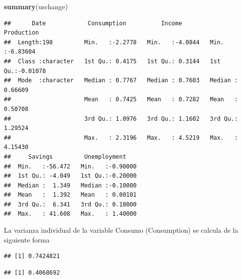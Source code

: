\documentclass[
]{article}
\newenvironment{Shaded}{\begin{snugshade}}{\end{snugshade}}
\newcommand{\FunctionTok}[1]{\textcolor[rgb]{0.13,0.29,0.53}{\textbf{#1}}}
\newcommand{\NormalTok}[1]{#1}
\newcommand{\SpecialCharTok}[1]{\textcolor[rgb]{0.81,0.36,0.00}{\textbf{#1}}}
\begin{document}
\begin{Shaded}
\begin{Highlighting}[]
\FunctionTok{summary}\NormalTok{(uschange)}
\end{Highlighting}
\end{Shaded}

\begin{verbatim}
##      Date            Consumption          Income          Production      
##  Length:198         Min.   :-2.2778   Min.   :-4.0844   Min.   :-6.83604  
##  Class :character   1st Qu.: 0.4175   1st Qu.: 0.3144   1st Qu.:-0.01078  
##  Mode  :character   Median : 0.7767   Median : 0.7603   Median : 0.66609  
##                     Mean   : 0.7425   Mean   : 0.7282   Mean   : 0.50708  
##                     3rd Qu.: 1.0976   3rd Qu.: 1.1602   3rd Qu.: 1.29524  
##                     Max.   : 2.3196   Max.   : 4.5219   Max.   : 4.15430  
##     Savings         Unemployment     
##  Min.   :-56.472   Min.   :-0.90000  
##  1st Qu.: -4.049   1st Qu.:-0.20000  
##  Median :  1.349   Median :-0.10000  
##  Mean   :  1.392   Mean   : 0.00101  
##  3rd Qu.:  6.341   3rd Qu.: 0.10000  
##  Max.   : 41.608   Max.   : 1.40000
\end{verbatim}

La varianza individual de la variable Consumo (Consumption) se calcula
de la siguiente forma

\begin{Shaded}
\end{Shaded}

\begin{verbatim}
## [1] 0.7424821
\end{verbatim}

\begin{Shaded}
\end{Shaded}

\begin{verbatim}
## [1] 0.4068692
\end{verbatim}

\begin{Shaded}
\end{Shaded}
\end{document}
